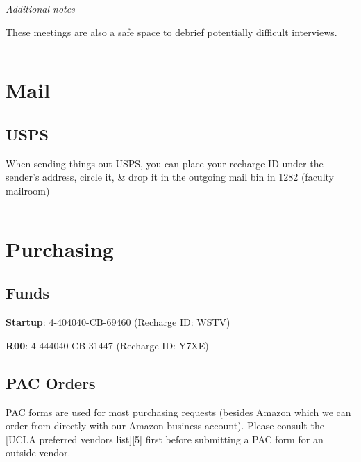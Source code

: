 \documentclass[]{book}
\begin{document}
\emph{Additional notes}

These meetings are also a safe space to debrief potentially difficult interviews.

\begin{center}\rule{0.5\linewidth}{\linethickness}\end{center}

\hypertarget{mail}{%
\section{Mail}\label{mail}}

\hypertarget{usps}{%
\subsection{USPS}\label{usps}}

When sending things out USPS, you can place your recharge ID under the sender's address, circle it, \& drop it in the outgoing mail bin in 1282 (faculty mailroom)

\begin{center}\rule{0.5\linewidth}{\linethickness}\end{center}

\hypertarget{purchasing}{%
\section{Purchasing}\label{purchasing}}

\hypertarget{funds}{%
\subsection{Funds}\label{funds}}

\textbf{Startup}: 4-404040-CB-69460 (Recharge ID: WSTV)

\textbf{R00}: 4-444040-CB-31447 (Recharge ID: Y7XE)

\hypertarget{pac-orders}{%
\subsection{PAC Orders}\label{pac-orders}}

PAC forms are used for most purchasing requests (besides Amazon which we can order from directly with our Amazon business account). Please consult the {[}UCLA preferred vendors list{]}{[}5{]} first before submitting a PAC form for an outside vendor.
\end{document}
